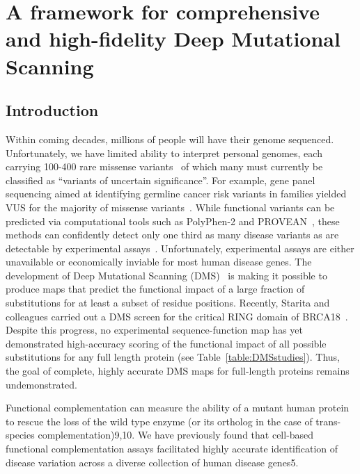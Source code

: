 

\chapter[High-fidelity and comprehensive DMS framework]{A framework for comprehensive and high-fidelity Deep Mutational Scanning}

\section{Introduction}

Within coming decades, millions of people will have their genome sequenced. Unfortunately, we have limited ability to interpret personal genomes, each carrying 100-400 rare missense variants~\cite{the_1000_genomes_project_consortium_global_2015} of which many must currently be classified as “variants of uncertain significance”. For example, gene panel sequencing aimed at identifying germline cancer risk variants in families yielded VUS for the majority of missense variants~\cite{maxwell_evaluation_2016}.  While functional variants can be predicted via computational tools such as PolyPhen-2\cite{adzhubei_method_2010} and PROVEAN~\cite{choi_fast_2012}, these methods can confidently detect only one third as many disease variants as are detectable by experimental assays~\cite{sun_extended_2016}. Unfortunately, experimental assays are either unavailable or economically inviable for most human disease genes. The development of Deep Mutational Scanning (DMS)~\cite{fowler_high-resolution_2010} is making it possible to produce maps that predict the functional impact of a large fraction of substitutions for at least a subset of residue positions. Recently, Starita and colleagues carried out a DMS screen for the critical RING domain of BRCA18~\cite{starita_massively_2015}. Despite this progress, no experimental sequence-function map has yet demonstrated high-accuracy scoring of the functional impact of all possible substitutions for any full length protein (see Table~\ref{table:DMSstudies}). Thus, the goal of complete, highly accurate DMS maps for full-length proteins remains undemonstrated.

Functional complementation can measure the ability of a mutant human protein to rescue the loss of the wild type enzyme (or its ortholog in the case of trans-species complementation)9,10. We have previously found that cell-based functional complementation assays facilitated highly accurate identification of disease variation across a diverse collection of human disease genes5. 

